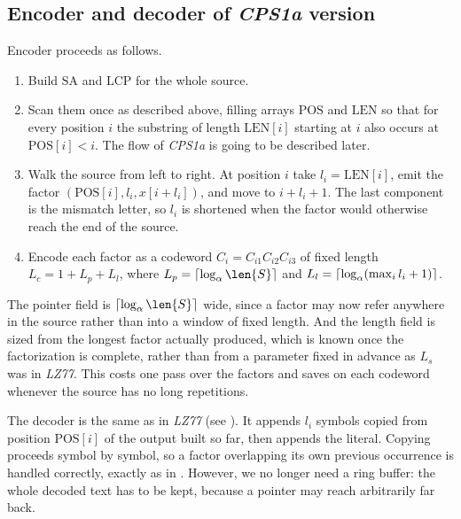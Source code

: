 \subsection{Encoder and decoder of \emph{CPS1a} version}
\noindent Encoder proceeds as follows.
\begin{enumerate}
    \item Build \(\mathrm{SA}\) and \(\mathrm{LCP}\) for the whole source.
    \item Scan them once as described above, filling arrays \(\mathrm{POS}\) and \(\mathrm{LEN}\) so that for every position \(i\) the substring of length \(\mathrm{LEN}[i]\) starting at \(i\) also occurs at \(\mathrm{POS}[i] < i\). The flow of \emph{CPS1a} is going to be described later.
    \item Walk the source from left to right. At position \(i\) take \(l_i = \mathrm{LEN}[i]\), emit the factor \((\mathrm{POS}[i], l_i, x[i + l_i])\), and move to \(i + l_i + 1\). The last component is the mismatch letter, so \(l_i\) is shortened when the factor would otherwise reach the end of the source.
    \item Encode each factor as a codeword \(C_i = C_{i1} C_{i2} C_{i3}\) of fixed length \(L_c = 1 + L_p + L_l\), where \(L_p = \ceil{\log_\alpha \len{S}}\) and \(L_l = \left\lceil\log_\alpha (\max_i l_i + 1)\right\rceil\).
\end{enumerate}

The pointer field is \(\ceil{\log_\alpha \len{S}}\) wide, since a factor may now refer anywhere in the source rather than into a window of fixed length. And the length field is sized from the longest factor actually produced, which is known once the factorization is complete, rather than from a parameter fixed in advance as \(L_s\) was in \emph{LZ77}. This costs one pass over the factors and saves on each codeword whenever the source has no long repetitions.

The decoder is the same as in \emph{LZ77} (see ). It appends \(l_i\) symbols copied from position \(\mathrm{POS}[i]\) of the output built so far, then appends the literal. Copying proceeds symbol by symbol, so a factor overlapping its own previous occurrence is handled correctly, exactly as in . However, we no longer need a ring buffer: the whole decoded text has to be kept, because a pointer may reach arbitrarily far back.